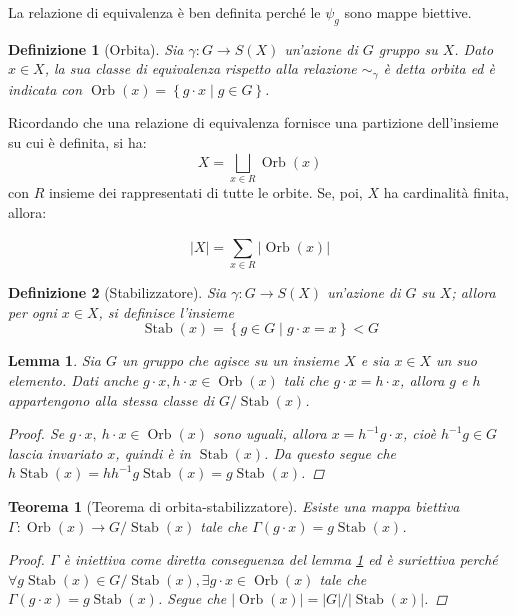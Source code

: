 \documentclass[11pt]{scrartcl}
\theoremstyle{style1}
\newtheorem{teorema}{Teorema}[section]
\newtheorem{lemma}{Lemma}[teorema]
\newtheorem{definizione}{Definizione}[section]
\newenvironment{boxenv}[1][]{
    \begin{eqbox}[#1]
    }{
   \end{eqbox}
}
\numberwithin{equation}{subsection}
\begin{document}
La relazione di equivalenza \`e ben definita perch\'e le $\psi _g$ sono mappe biettive.
\begin{definizione}
	[Orbita]
	Sia $\gamma :G \to S(X)$ un'azione di $G$ gruppo su $X$. Dato $x \in X$, la sua classe di equivalenza rispetto alla relazione $\sim _\gamma$ \`e detta \textit{orbita} ed \`e indicata con $\operatorname{Orb} (x) = \left\{ g \cdot  x  \mid g \in G\right\} $.
\end{definizione}
\noindent Ricordando che una relazione di equivalenza fornisce una partizione dell'insieme su cui \`e definita, si ha:
\begin{equation}
	X = \bigsqcup_{x \in R} \operatorname{Orb} (x)
\end{equation}
con $R$ insieme dei rappresentati di tutte le orbite.
Se, poi, $X$ ha cardinalit\`a finita, allora:
\begin{boxenv}[]
\begin{equation}
	\lvert X \rvert  = \sum_{x \in R}^{} \lvert \operatorname{Orb} (x) \rvert 
\end{equation}
\end{boxenv}
\begin{definizione}
	[Stabilizzatore]
	Sia $\gamma: G \to S(X)$ un'azione di $G$ su $X$; allora per ogni $x \in X$, si definisce l'insieme 
	\[
	\operatorname{Stab} (x) = \left\{ g \in G  \mid g \cdot  x = x \right\} < G 
	\] 	
\end{definizione}
\begin{lemma}\label{l111}
	Sia $G$ un gruppo che agisce su un insieme $X$ e sia $x \in X$ un suo elemento. Dati anche $g\cdot x , h \cdot x \in \operatorname{Orb} (x)$ tali che $g \cdot x = h\cdot x$, allora $g$ e $h$ appartengono alla stessa classe di $G / \operatorname{Stab} (x)$.
\begin{proof}
	Se $g \cdot x, \ h\cdot x \in \operatorname{Orb} (x)$ sono uguali, allora $x =h^{-1} g \cdot x $, cio\`e $h^{-1} g \in G$ lascia invariato $x$, quindi \`e in $\operatorname{Stab} (x)$.
	Da questo segue che $h \operatorname{Stab} (x) = h h^{-1} g \operatorname{Stab} (x) = g \operatorname{Stab} (x)$.
\end{proof}
\end{lemma}
\begin{teorema}[Teorema di orbita-stabilizzatore]\label{osth}
	Esiste una mappa biettiva $\Gamma : \operatorname{Orb} (x) \to G / \operatorname{Stab} (x)$ tale che $\Gamma(g \cdot x) = g \operatorname{Stab} (x)$.
	\begin{proof}
		$\Gamma$ \`e iniettiva come diretta conseguenza del lemma \ref{l111} ed \`e suriettiva perch\'e $\forall g \operatorname{Stab} (x) \in G / \operatorname{Stab} (x), \exists g\cdot x \in \operatorname{Orb} (x)$ tale che $\Gamma(g\cdot x) = g \operatorname{Stab} (x)$.
		Segue che $\lvert \operatorname{Orb} (x)  \rvert = \lvert G \rvert / \lvert \operatorname{Stab} (x) \rvert $.
	\end{proof}
\end{teorema}
\end{document}
